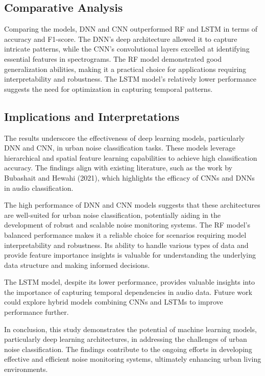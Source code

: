 \documentclass[conference]{IEEEtran}
\begin{document}
\subsection{Comparative Analysis}

Comparing the models, DNN and CNN outperformed RF and LSTM in terms of accuracy and F1-score. The DNN's deep architecture allowed it to capture intricate patterns, while the CNN's convolutional layers excelled at identifying essential features in spectrograms. The RF model demonstrated good generalization abilities, making it a practical choice for applications requiring interpretability and robustness. The LSTM model's relatively lower performance suggests the need for optimization in capturing temporal patterns.

\subsection{Implications and Interpretations}

The results underscore the effectiveness of deep learning models, particularly DNN and CNN, in urban noise classification tasks. These models leverage hierarchical and spatial feature learning capabilities to achieve high classification accuracy. The findings align with existing literature, such as the work by Bubashait and Hewahi (2021), which highlights the efficacy of CNNs and DNNs in audio classification.

The high performance of DNN and CNN models suggests that these architectures are well-suited for urban noise classification, potentially aiding in the development of robust and scalable noise monitoring systems. The RF model's balanced performance makes it a reliable choice for scenarios requiring model interpretability and robustness. Its ability to handle various types of data and provide feature importance insights is valuable for understanding the underlying data structure and making informed decisions.

The LSTM model, despite its lower performance, provides valuable insights into the importance of capturing temporal dependencies in audio data. Future work could explore hybrid models combining CNNs and LSTMs to improve performance further.

In conclusion, this study demonstrates the potential of machine learning models, particularly deep learning architectures, in addressing the challenges of urban noise classification. The findings contribute to the ongoing efforts in developing effective and efficient noise monitoring systems, ultimately enhancing urban living environments.
\end{document}
